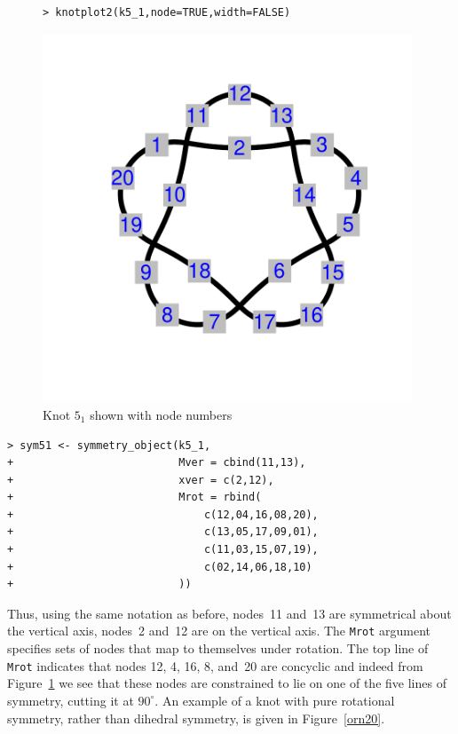 \documentclass{birkjour}
\theoremstyle{definition}
\theoremstyle{remark}
\numberwithin{equation}{section}
\begin{document}
\begin{figure}[htbp]
  \begin{center}
\begin{verbatim}
> knotplot2(k5_1,node=TRUE,width=FALSE)
\end{verbatim}
\includegraphics[width=11cm]{knot-k5_1}  %
\caption{Knot $5_1$ \label{k5_1_twoknots} shown with node numbers}
  \end{center}
\end{figure}

\begin{verbatim}
> sym51 <- symmetry_object(k5_1,
+                          Mver = cbind(11,13),
+                          xver = c(2,12),
+                          Mrot = rbind(
+                              c(12,04,16,08,20),
+                              c(13,05,17,09,01),
+                              c(11,03,15,07,19),
+                              c(02,14,06,18,10)
+                          ))
\end{verbatim}

Thus, using the same notation as before, nodes~11 and~13 are
symmetrical about the vertical axis, nodes~2 and~12 are on the
vertical axis.  The {\tt Mrot} argument specifies sets of nodes that
map to themselves under rotation.  The top line of {\tt Mrot}
indicates that nodes 12, 4, 16, 8, and~20 are concyclic and indeed
from Figure~\ref{k5_1_twoknots} we see that these nodes are
constrained to lie on one of the five lines of symmetry, cutting it at
$90^\circ$.  An example of a knot with pure rotational symmetry,
rather than dihedral symmetry, is given in Figure~\ref{orn20}.
\end{document}
